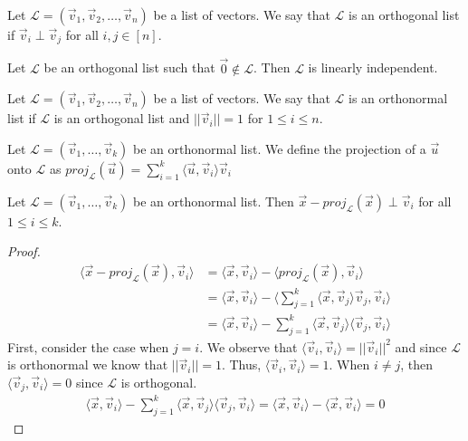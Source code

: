 \begin{definition}
    Let $\mathcal{L}=(\vec{v}_1,\vec{v}_2,\ldots,\vec{v}_n)$ be a list of vectors. We say that $\mathcal{L}$ is an orthogonal list if $\vec{v}_i\perp\vec{v}_j$ for all $i,j\in [n]$.
\end{definition}
\begin{theorem}
    Let $\mathcal{L}$ be an orthogonal list such that $\vec{0}\notin \mathcal{L}$. Then $\mathcal{L}$ is linearly independent.
\end{theorem}
\begin{definition}
    Let $\mathcal{L}=(\vec{v}_1,\vec{v}_2,\ldots,\vec{v}_n)$ be a list of vectors. We say that $\mathcal{L}$ is an orthonormal list if $\mathcal{L}$ is an orthogonal list and $||\vec{v}_i||=1$ for $1\leq i\leq n$.
\end{definition}
\begin{definition}
    Let $\mathcal{L}=(\vec{v}_1,\ldots,\vec{v}_k)$ be an orthonormal list. We define the projection of a $\vec{u}$ onto $\mathcal{L}$ as $proj_\mathcal{L}(\vec{u})=\sum_{i=1}^k\langle\vec{u},\vec{v}_i\rangle\vec{v}_i$
\end{definition}
\begin{theorem}
    Let $\mathcal{L}=(\vec{v}_1,\ldots,\vec{v}_k)$ be an orthonormal list. Then $\vec{x}-proj_\mathcal{L}(\vec{x})\perp \vec{v}_i$ for all $1\leq i\leq k$.
\end{theorem}
\begin{proof}
    \begin{align*}
        \langle \vec{x}-proj_\mathcal{L}(\vec{x}), \vec{v}_i\rangle&=\langle\vec{x},\vec{v}_i\rangle-\langle proj_\mathcal{L}(\vec{x}),\vec{v}_i\rangle\tag{by Linearity}\\
        &=\langle\vec{x},\vec{v}_i\rangle-\langle\sum_{j=1}^k\langle\vec{x},\vec{v}_j\rangle\vec{v}_j,\vec{v}_i\rangle\\
        &=\langle\vec{x},\vec{v}_i\rangle-\sum_{j=1}^k\langle\vec{x},\vec{v}_j\rangle\langle\vec{v}_j,\vec{v}_i\rangle\tag{by Linearity}
    \end{align*}
    First, consider the case when $j=i$. We observe that $\langle\vec{v}_i,\vec{v}_i\rangle=||\vec{v}_i||^2$ and since $\mathcal{L}$ is orthonormal we know that $||\vec{v}_i||=1$. Thus, $\langle\vec{v}_i,\vec{v}_i\rangle=1$. When $i\neq j$, then $\langle\vec{v}_j,\vec{v}_i\rangle=0$ since $\mathcal{L}$ is orthogonal.
    \begin{align*}
        \langle\vec{x},\vec{v}_i\rangle-\sum_{j=1}^k\langle\vec{x},\vec{v}_j\rangle\langle\vec{v}_j,\vec{v}_i\rangle=\langle\vec{x},\vec{v}_i\rangle-\langle\vec{x},\vec{v}_i\rangle=0
    \end{align*}
\end{proof}
